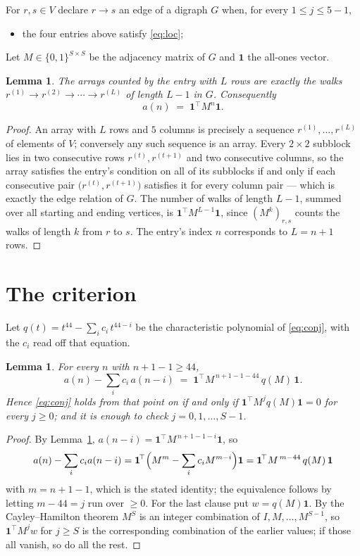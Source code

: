 \documentclass[11pt,a4paper]{article}
\theoremstyle{plain}
\newtheorem{lemma}[theorem]{Lemma}
\theoremstyle{definition}
\begin{document}
For $r,s\in V$ declare $r\to s$ an edge of a digraph $G$ when, for every
$1\le j\le 5-1$,
\begin{itemize}
\item the four entries above satisfy \eqref{eq:loc};

\end{itemize}
Let $M\in\{0,1\}^{S\times S}$ be the adjacency matrix of $G$ and $\mathbf{1}$ the
all-ones vector.

\begin{lemma}\label{lem:walk}
The arrays counted by the entry with $L$ rows are exactly the walks
$r^{(1)}\to r^{(2)}\to\cdots\to r^{(L)}$ of length $L-1$ in $G$. Consequently
\[
a(n)\;=\;\mathbf{1}^{\!\top}M^{n}\mathbf{1} .
\]
\end{lemma}

\begin{proof}
An array with $L$ rows and $5$ columns is precisely a sequence
$r^{(1)},\dots,r^{(L)}$ of elements of $V$; conversely any such sequence is an array.
Every $2\times2$ subblock lies in two consecutive rows $r^{(t)},r^{(t+1)}$ and two
consecutive columns, so the array satisfies the entry's condition on all of its subblocks
if and only if each consecutive pair $\bigl(r^{(t)},r^{(t+1)}\bigr)$ satisfies it for
every column pair --- which is exactly the edge relation of $G$. The number of walks of
length $L-1$, summed over all starting and ending vertices, is
$\mathbf{1}^{\!\top}M^{L-1}\mathbf{1}$, since $(M^{k})_{r,s}$ counts the walks of
length $k$ from $r$ to $s$. The entry's index $n$ corresponds to $L=n+1$ rows.
\end{proof}

\section{The criterion}

Let $q(t)=t^{44}-\sum_i c_i\,t^{44-i}$ be the characteristic polynomial of
\eqref{eq:conj}, with the $c_i$ read off that equation.

\begin{lemma}\label{lem:crit}
For every $n$ with $n+1-1\ge44$,
\[
a(n)-\sum_i c_i\,a(n-i)\;=\;\mathbf{1}^{\!\top}M^{\,n+1-1-44}\,q(M)\,\mathbf{1} .
\]
Hence \eqref{eq:conj} holds from that point on if and only if
$\mathbf{1}^{\!\top}M^{j}q(M)\mathbf{1}=0$ for every $j\ge0$; and it is enough to check
$j=0,1,\dots,S-1$.
\end{lemma}

\begin{proof}
By Lemma~\ref{lem:walk}, $a(n-i)=\mathbf{1}^{\!\top}M^{\,n+1-1-i}\mathbf{1}$, so
\[
a(n)-\sum_i c_i a(n-i)
=\mathbf{1}^{\!\top}\Bigl(M^{m}-\sum_i c_i M^{m-i}\Bigr)\mathbf{1}
=\mathbf{1}^{\!\top}M^{\,m-44}\,q(M)\,\mathbf{1}
\]
with $m=n+1-1$, which is the stated identity; the equivalence follows by letting
$m-44=j$ run over $\ge0$. For the last clause put $w=q(M)\mathbf{1}$. By the
Cayley--Hamilton theorem $M^{S}$ is an integer combination of $I,M,\dots,M^{S-1}$, so
$\mathbf{1}^{\!\top}M^{j}w$ for $j\ge S$ is the corresponding combination of the earlier
values; if those all vanish, so do all the rest.
\end{proof}
\end{document}
